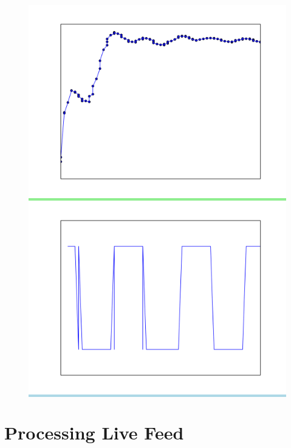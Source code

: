 \documentclass{beamer}
\begin{document}
\begin{frame}[foot]
\begin{figure}
{{{       \colorbox{lightgreen}{ \includegraphics[scale=.22]{./gfx/feature2.png} }
       }
       \vspace*{-1em}
       \colorbox{lightblue}{ \includegraphics[scale=.22]{./gfx/feature3.png} }
     }}

    \end{figure}
  \end{frame}

\section{Processing Live Feed}
\end{document}
